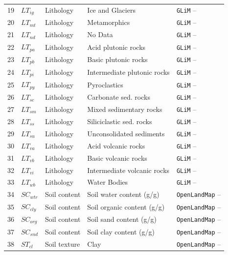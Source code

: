 \documentclass[12pt]{article}
\begin{document}
\begin{table}[htb]
\begin{tabular}{p{0.5cm}p{1cm}p{2cm}p{3.5cm}p{5cm}}
19 & $LT_{ig}$ & Lithology & Ice and Glaciers & \texttt{GLiM}  -- \cite{hartmann2012}\\
20 & $LT_{mt}$ & Lithology & Metamorphics & \texttt{GLiM}  -- \cite{hartmann2012}\\
21 & $LT_{nd}$ & Lithology & No Data & \texttt{GLiM}  -- \cite{hartmann2012}\\
22 & $LT_{pa}$ & Lithology & Acid plutonic rocks & \texttt{GLiM}  -- \cite{hartmann2012}\\
23 & $LT_{pb}$ & Lithology & Basic plutonic rocks & \texttt{GLiM}  -- \cite{hartmann2012}\\
24 & $LT_{pi}$ & Lithology & Intermediate plutonic rocks & \texttt{GLiM}  -- \cite{hartmann2012}\\
25 & $LT_{py}$ & Lithology & Pyroclastics & \texttt{GLiM}  -- \cite{hartmann2012}\\
26 & $LT_{sc}$ & Lithology & Carbonate sed. rocks & \texttt{GLiM}  -- \cite{hartmann2012}\\
27 & $LT_{sm}$ & Lithology & Mixed sedimentary rocks & \texttt{GLiM}  -- \cite{hartmann2012}\\
28 & $LT_{ss}$ & Lithology & Siliciclastic sed. rocks & \texttt{GLiM}  -- \cite{hartmann2012}\\
29 & $LT_{su}$ & Lithology & Unconsolidated sediments & \texttt{GLiM}  -- \cite{hartmann2012}\\
30 & $LT_{va}$ & Lithology & Acid volcanic rocks & \texttt{GLiM}  -- \cite{hartmann2012}\\
31 & $LT_{vb}$ & Lithology & Basic volcanic rocks & \texttt{GLiM}  -- \cite{hartmann2012}\\
32 & $LT_{vi}$ & Lithology & Intermediate volcanic rocks & \texttt{GLiM}  -- \cite{hartmann2012}\\
33 & $LT_{wb}$ & Lithology & Water Bodies & \texttt{GLiM}  -- \cite{hartmann2012}\\
34 & $SC_{wtr}$ & Soil content & Soil water content (g/g) & \texttt{OpenLandMap} -- \cite{hengl2017}\\
35 & $SC_{cly}$ & Soil content& Soil organic content (g/g) & \texttt{OpenLandMap} -- \cite{hengl2017}\\
36 & $SC_{org}$ & Soil content & Soil sand content (g/g) & \texttt{OpenLandMap} -- \cite{hengl2017}\\
37 & $SC_{snd}$ & Soil content & Soil clay content (g/g) & \texttt{OpenLandMap} -- \cite{hengl2017}\\
38 & $ST_{cl}$ & Soil texture & Clay & \texttt{OpenLandMap}  -- \cite{hengl2017}\\

\end{tabular}
\end{table}
\end{document}
